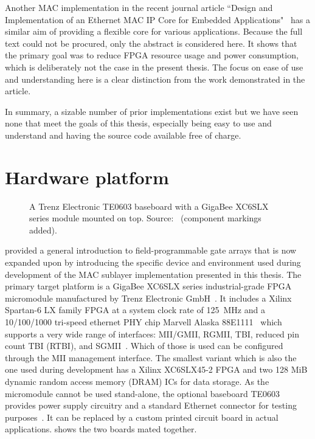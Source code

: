 \documentclass[a4paper, 11pt, oneside]{Thesis}  %
\begin{document}
Another MAC implementation in the recent journal article ``Design and Implementation of an Ethernet MAC IP Core for Embedded Applications"~\cite{MAC_journal} has a similar aim of providing a flexible core for various applications. Because the full text could not be procured, only the abstract is considered here. It shows that the primary goal was to reduce FPGA resource usage and power consumption, which is deliberately not the case in the present thesis. The focus on ease of use and understanding here is a clear distinction from the work demonstrated in the article.

In summary, a sizable number of prior implementations exist but we have seen none that meet the goals of this thesis, especially being easy to use and understand and having the source code available free of charge.

\section{Hardware platform}\label{ch:hw_spartan}

\begin{figure}
\centering

\caption[Trenz Electronic TE0603 baseboard with a GigaBee XC6SLX series module mounted on top]{A Trenz Electronic TE0603 baseboard with a GigaBee XC6SLX series module mounted on top. Source:~\cite{GigaBeeImage} (component markings added).}
\label{fig:te0600}
\end{figure}

 provided a general introduction to field-programmable gate arrays that is now expanded upon by introducing the specific device and environment used during development of the MAC sublayer implementation presented in this thesis. The primary target platform is a GigaBee XC6SLX series industrial-grade FPGA micromodule manufactured by Trenz Electronic GmbH~\cite{TE0600Page}. It includes a Xilinx Spartan-6 LX family FPGA at a system clock rate of 125~MHz and a 10/100/1000 tri-speed ethernet PHY chip Marvell Alaska 88E1111~\cite{TE0600} which supports a very wide range of interfaces: MII/GMII, RGMII, TBI, reduced pin count TBI (RTBI), and SGMII~\cite{MarvellPHY}. Which of those is used can be configured through the MII management interface. The smallest variant which is also the one used during development has a Xilinx XC6SLX45-2 FPGA and two 128 MiB dynamic random access memory (DRAM) ICs for data storage. As the micromodule cannot be used stand-alone, the optional baseboard TE0603 provides power supply circuitry and a standard Ethernet connector for testing purposes~\cite{TE0603}. It can be replaced by a custom printed circuit board in actual applications.  shows the two boards mated together.
\end{document}

